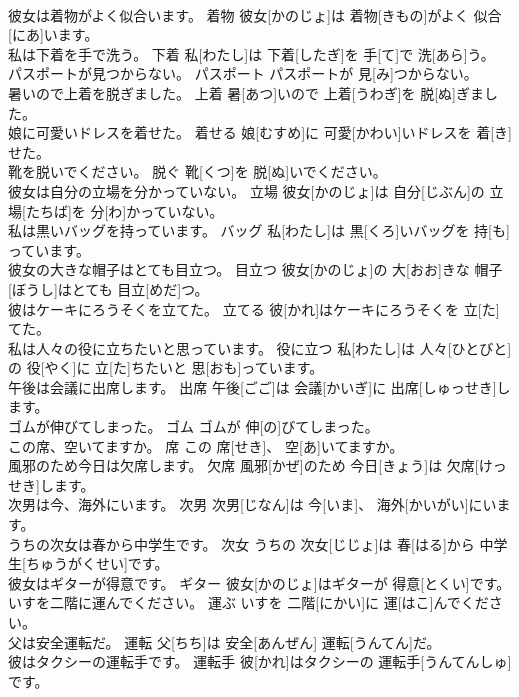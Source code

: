 \documentclass[8pt]{extreport}
\begin{document}
\begin{CJK}{UTF8}{min}
\\	彼女は着物がよく似合います。	着物	彼女[かのじょ]は 着物[きもの]がよく 似合[にあ]います。	
\\	私は下着を手で洗う。	下着	私[わたし]は 下着[したぎ]を 手[て]で 洗[あら]う。	
\\	パスポートが見つからない。	パスポート	パスポートが 見[み]つからない。	
\\	暑いので上着を脱ぎました。	上着	暑[あつ]いので 上着[うわぎ]を 脱[ぬ]ぎました。	
\\	娘に可愛いドレスを着せた。	着せる	娘[むすめ]に 可愛[かわい]いドレスを 着[き]せた。	
\\	靴を脱いでください。	脱ぐ	靴[くつ]を 脱[ぬ]いでください。	
\\	彼女は自分の立場を分かっていない。	立場	彼女[かのじょ]は 自分[じぶん]の 立場[たちば]を 分[わ]かっていない。	
\\	私は黒いバッグを持っています。	バッグ	私[わたし]は 黒[くろ]いバッグを 持[も]っています。	
\\	彼女の大きな帽子はとても目立つ。	目立つ	彼女[かのじょ]の 大[おお]きな 帽子[ぼうし]はとても 目立[めだ]つ。	
\\	彼はケーキにろうそくを立てた。	立てる	彼[かれ]はケーキにろうそくを 立[た]てた。	
\\	私は人々の役に立ちたいと思っています。	役に立つ	私[わたし]は 人々[ひとびと]の 役[やく]に 立[た]ちたいと 思[おも]っています。	
\\	午後は会議に出席します。	出席	午後[ごご]は 会議[かいぎ]に 出席[しゅっせき]します。	
\\	ゴムが伸びてしまった。	ゴム	ゴムが 伸[の]びてしまった。	
\\	この席、空いてますか。	席	この 席[せき]、 空[あ]いてますか。	
\\	風邪のため今日は欠席します。	欠席	風邪[かぜ]のため 今日[きょう]は 欠席[けっせき]します。	
\\	次男は今、海外にいます。	次男	次男[じなん]は 今[いま]、 海外[かいがい]にいます。	
\\	うちの次女は春から中学生です。	次女	うちの 次女[じじょ]は 春[はる]から 中学生[ちゅうがくせい]です。	
\\	彼女はギターが得意です。	ギター	彼女[かのじょ]はギターが 得意[とくい]です。	
\\	いすを二階に運んでください。	運ぶ	いすを 二階[にかい]に 運[はこ]んでください。	
\\	父は安全運転だ。	運転	父[ちち]は 安全[あんぜん] 運転[うんてん]だ。	
\\	彼はタクシーの運転手です。	運転手	彼[かれ]はタクシーの 運転手[うんてんしゅ]です。	

\end{CJK}
\end{document}
